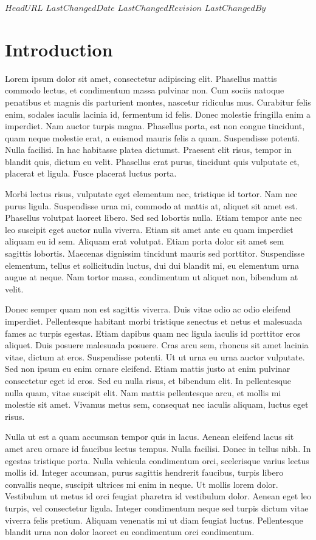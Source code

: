 \svnidlong
{$HeadURL$}
{$LastChangedDate$}
{$LastChangedRevision$}
{$LastChangedBy$}

\chapter{Introduction}
Lorem ipsum dolor sit amet, consectetur adipiscing elit.
Phasellus mattis commodo lectus, et condimentum massa pulvinar non.
Cum sociis natoque penatibus et magnis dis parturient montes, nascetur ridiculus mus.
Curabitur felis enim, sodales iaculis lacinia id, fermentum id felis.
Donec molestie fringilla enim a imperdiet.
Nam auctor turpis magna.
Phasellus porta, est non congue tincidunt, quam neque molestie erat, a euismod mauris felis a quam.
Suspendisse potenti.
Nulla facilisi.
In hac habitasse platea dictumst.
Praesent elit risus, tempor in blandit quis, dictum eu velit.
Phasellus erat purus, tincidunt quis vulputate et, placerat et ligula.
Fusce placerat luctus porta.

Morbi lectus risus, vulputate eget elementum nec, tristique id tortor.
Nam nec purus ligula.
Suspendisse urna mi, commodo at mattis at, aliquet sit amet est.
Phasellus volutpat laoreet libero.
Sed sed lobortis nulla.
Etiam tempor ante nec leo suscipit eget auctor nulla viverra.
Etiam sit amet ante eu quam imperdiet aliquam eu id sem.
Aliquam erat volutpat.
Etiam porta dolor sit amet sem sagittis lobortis.
Maecenas dignissim tincidunt mauris sed porttitor.
Suspendisse elementum, tellus et sollicitudin luctus, dui dui blandit mi, eu elementum urna augue at neque.
Nam tortor massa, condimentum ut aliquet non, bibendum at velit.

Donec semper quam non est sagittis viverra.
Duis vitae odio ac odio eleifend imperdiet.
Pellentesque habitant morbi tristique senectus et netus et malesuada fames ac turpis egestas.
Etiam dapibus quam nec ligula iaculis id porttitor eros aliquet.
Duis posuere malesuada posuere.
Cras arcu sem, rhoncus sit amet lacinia vitae, dictum at eros.
Suspendisse potenti.
Ut ut urna eu urna auctor vulputate.
Sed non ipsum eu enim ornare eleifend.
Etiam mattis justo at enim pulvinar consectetur eget id eros.
Sed eu nulla risus, et bibendum elit.
In pellentesque nulla quam, vitae suscipit elit.
Nam mattis pellentesque arcu, et mollis mi molestie sit amet.
Vivamus metus sem, consequat nec iaculis aliquam, luctus eget risus.

Nulla ut est a quam accumsan tempor quis in lacus.
Aenean eleifend lacus sit amet arcu ornare id faucibus lectus tempus.
Nulla facilisi.
Donec in tellus nibh.
In egestas tristique porta.
Nulla vehicula condimentum orci, scelerisque varius lectus mollis id.
Integer accumsan, purus sagittis hendrerit faucibus, turpis libero convallis neque, suscipit ultrices mi enim in neque.
Ut mollis lorem dolor.
Vestibulum ut metus id orci feugiat pharetra id vestibulum dolor.
Aenean eget leo turpis, vel consectetur ligula.
Integer condimentum neque sed turpis dictum vitae viverra felis pretium.
Aliquam venenatis mi ut diam feugiat luctus.
Pellentesque blandit urna non dolor laoreet eu condimentum orci condimentum.

